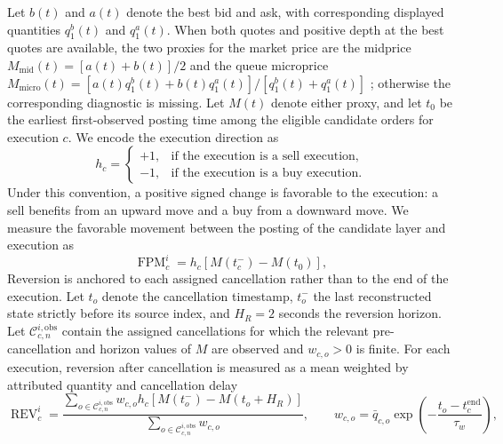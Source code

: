 \documentclass[11pt]{article}
\newenvironment{review}{\begingroup\color{blue}}{\endgroup}
\begin{document}
Let $b(t)$ and $a(t)$ denote the best bid and ask, with corresponding displayed quantities $q^b_1(t)$ and $q^a_1(t)$. When
both quotes and \begin{review}positive depth at the best quotes\end{review} are available, \begin{review}the two proxies for the market price\end{review} are the midprice
$M_{\mathrm{mid}}(t)=[a(t)+b(t)]/2$ and the queue microprice
$M_{\mathrm{micro}}(t)=[a(t)q^b_1(t)+b(t)q^a_1(t)]/[q^b_1(t)+q^a_1(t)]$
\cite{Stoikov02122018}; otherwise the corresponding diagnostic is missing. Let $M(t)$ denote either proxy, and let $t_0$
be the earliest first-observed posting time among the eligible candidate orders for execution $c$. We encode the
execution direction as
\begin{equation}
    h_c=
    \begin{cases}
        +1, & \text{if the execution is a sell execution,}\\
        -1, & \text{if the execution is a buy execution.}
    \end{cases}
    \label{eq:price_response_direction}
\end{equation}
Under this convention, a positive signed change is favorable to the execution: a sell benefits from an upward move and a
buy from a downward move. We measure the favorable movement \begin{review}between the posting of the candidate layer and execution\end{review} as
\begin{equation}
    \operatorname{FPM}^{i}_{c}
    =
    h_c\left[M(t_c^{-})-M(t_0)\right],
    \label{eq:favorable_price_move}
\end{equation}
Reversion is anchored to each assigned cancellation rather than to the end of the execution. Let $t_o$ denote the
cancellation timestamp, $t_o^{-}$ the last reconstructed state strictly before its source index, and $H_R=2$ seconds the
reversion horizon. Let $\mathcal{C}_{c,n}^{i,\mathrm{obs}}$ contain the assigned cancellations for which the relevant
pre-cancellation and horizon values of $M$ are observed and $w_{c,o}>0$ is finite. \begin{review}For each execution, reversion after cancellation is measured as a mean weighted by attributed quantity and cancellation delay\end{review}
\begin{equation}
    \operatorname{REV}^{i}_{c}
    =
    \frac{
        \sum_{o\in\mathcal{C}_{c,n}^{i,\mathrm{obs}}}
        w_{c,o}h_c\left[M(t_o^{-})-M(t_o+H_R)\right]
    }{
        \sum_{o\in\mathcal{C}_{c,n}^{i,\mathrm{obs}}} w_{c,o}
    },
    \qquad
    w_{c,o}=\bar q_{c,o}\exp\!\left(-\frac{t_o-t_c^{\mathrm{end}}}{\tau_w}\right),
    \label{eq:price_reversion}
\end{equation}
\end{document}
